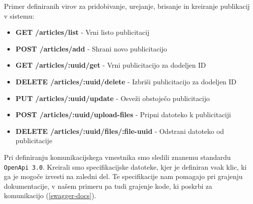 \documentclass[a4paper, 12pt]{book}
\begin{document}
\begin{description}
    \item Primer definiranih virov za pridobivanje, urejanje, brisanje in kreiranje publikacij v sistemu:
    \begin{itemize}
        \item \textbf{GET /articles/list} - Vrni listo publicitacij
        \item \textbf{POST /articles/add} - Shrani novo publicitacijo
        \item \textbf{GET /articles/:uuid/get} - Vrni publicitacijo za dodeljen ID 
        \item \textbf{DELETE /articles/:uuid/delete} - Izbriši publicitacijo za dodeljen ID
        \item \textbf{PUT /articles/:uuid/update} - Osveži obstoječo publicitacijo
        \item \textbf{POST /articles/:uuid/upload-files} - Pripni datoteko k publicitaciji
        \item \textbf{DELETE /articles/:uuid/files/:file-uuid} - Odstrani datoteko od publicitacije
    \end{itemize}
\end{description}

Pri definiranju komunikacijskega vmestnika smo sledili znanemu standardu \verb=OpenApi 3.0=. Kreirali smo specifikacijske datoteke, kjer je definiran vsak klic, ki ga je mogoče izvesti na zaledni del. Te specifikacije nam pomagajo pri grajenju dokumentacije, v našem primeru pa tudi grajenje kode, ki poskrbi za komunikacijo (\ref{swagger-docs}).
\end{document}
